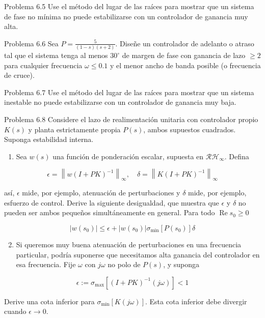 Problema 6.5 Use el método del lugar de las raíces para mostrar que un sistema de fase no mínima no puede estabilizarse con un controlador de ganancia muy alta.

Problema 6.6 Sea $P=\frac{5}{(1-s)(s+2)}$. Diseñe un controlador de adelanto o atraso tal que el sistema tenga al menos $30^{\circ}$ de margen de fase con ganancia de lazo $\geq 2$ para cualquier frecuencia $\omega \leq 0.1$ y el menor ancho de banda posible (o frecuencia de cruce).

Problema 6.7 Use el método del lugar de las raíces para mostrar que un sistema inestable no puede estabilizarse con un controlador de ganancia muy baja.

Problema 6.8 Considere el lazo de realimentación unitaria con controlador propio $K(s)$ y planta estrictamente propia $P(s)$, ambos supuestos cuadrados. Suponga estabilidad interna.

\begin{enumerate}
  \item Sea $w(s)$ una función de ponderación escalar, supuesta en $\mathcal{R} \mathcal{H}_{\infty}$. Defina
\end{enumerate}

$$
\epsilon=\left\|w(I+P K)^{-1}\right\|_{\infty}, \quad \delta=\left\|K(I+P K)^{-1}\right\|_{\infty}
$$

así, $\epsilon$ mide, por ejemplo, atenuación de perturbaciones y $\delta$ mide, por ejemplo, esfuerzo de control. Derive la siguiente desigualdad, que muestra que $\epsilon$ y $\delta$ no pueden ser ambos pequeños simultáneamente en general. Para todo $\operatorname{Re} s_{0} \geq 0$

$$
\left|w\left(s_{0}\right)\right| \leq \epsilon+\left|w\left(s_{0}\right)\right| \sigma_{\min }\left[P\left(s_{0}\right)\right] \delta
$$

\begin{enumerate}
  \setcounter{enumi}{1}
  \item Si queremos muy buena atenuación de perturbaciones en una frecuencia particular, podría suponerse que necesitamos alta ganancia del controlador en esa frecuencia. Fije $\omega$ con $j \omega$ no polo de $P(s)$, y suponga
\end{enumerate}

$$
\epsilon:=\sigma_{\max }\left[(I+P K)^{-1}(j \omega)\right]<1
$$

Derive una cota inferior para $\sigma_{\min }[K(j \omega)]$. Esta cota inferior debe divergir cuando $\epsilon \rightarrow 0$.

